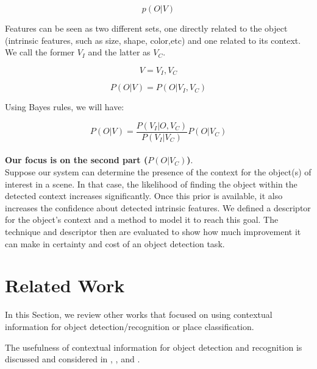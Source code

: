 \begin{equation}
 \label{ObjectDetction.eq}
    p(O|V)
\end{equation}

Features can be seen as two different sets, one directly related to the object (intrinsic features, such as size, shape, color,etc) and one related to its context. We call the former $V_I$ and the latter as $V_C$.

\begin{equation}
 \label{FeaturesSet.eq}
    V = {V_I,V_C}
\end{equation}

\begin{equation}
 \label{ObjectDetctionExtended.eq}
    P(O|V) = P(O|V_I,V_C)
\end{equation}

Using Bayes rules, we will have:

\begin{equation}
 \label{ObjectDetctionBayesapplied.eq}
    P(O|V) = \frac{P(V_I|O,V_C)}{P(V_I|V_C)} P(O|V_C)
\end{equation}
\\
{\bf Our focus is on the second part ($P(O|V_C)$)}.\\ 
Suppose our system can determine the presence of the context for the object(s) of interest in a scene. In that case, the likelihood of finding the object within the detected context increases significantly. Once this prior is available, it also increases the confidence about detected intrinsic features. 
We defined a descriptor for the object's context and a method to model it to reach this goal. The technique and descriptor then are evaluated to show how much improvement it can make in certainty and cost of an object detection task.



\section {Related Work}
\label{RelatedWork.sec}
     In this Section, we review other works that focused on using contextual information for object detection/recognition 
     or place classification.
     
The usefulness of contextual information for object detection and recognition is discussed and
considered in \cite{TrollbaContexBased}, \cite{TorralbaContextualPriming}, \cite{PerkoLeonardisContextDriven}
and \cite{aydemir2012_3Dcontext}.

